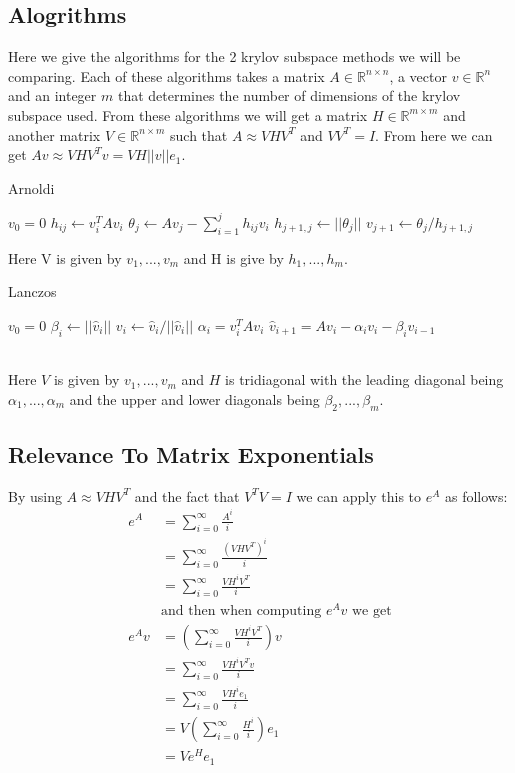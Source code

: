 \documentclass{article}
\begin{document}
\subsection{Alogrithms}
Here we give the algorithms for the 2 krylov subspace methods we will be comparing.
Each of these algorithms takes a matrix $A\in \mathbb{R}^{n\times n}$, a vector $v \in \mathbb{R}^n$ and an integer $m$ that determines the number of dimensions of the krylov subspace used.
From these algorithms we will get a matrix $H \in \mathbb{R}^{m\times m}$ and another matrix $V \in \mathbb{R}^{n\times m}$ such that $A \approx VHV^T$ and $VV^T = I$.
From here we can get $Av \approx VHV^Tv = VH||v||e_1$.

\begin{algorithm}
\caption{Arnoldi \cite{Fan2018}} %
\begin{algorithmic}
\State $v_0 = 0$
\State$h_{ij} \gets v_i^T A v_i$
\EndFor
\State$\theta_j \gets Av_j - \sum^j_{i=1} h_{ij}v_i$
\State$h_{j+1,j} \gets ||\theta_j||$
\State$v_{j+1} \gets \theta_j/h_{j+1,j}$
\EndFor
\EndProcedure
\end{algorithmic}
\end{algorithm}
Here V is given by $v_1,...,v_m$ and H is give by $h_1,...,h_m$.\\
\begin{algorithm}
\caption{Lanczos \cite{OJALVO1970}}
\begin{algorithmic}
\State $v_0 = 0$
\State$\beta_i \gets || \hat v_i ||$
\State$v_i \gets \hat v_i / || \hat v_i ||$
\State$\alpha_i = v_i^T A v_i$
\State$\hat v_{i+1} = Av_i - \alpha_iv_i - \beta_iv_{i-1}$
\EndFor
\EndProcedure
\end{algorithmic}
\end{algorithm}\\
Here $V$ is given by ${v_1,...,v_m}$ and $H$ is tridiagonal with the leading diagonal being $\alpha_1, ..., \alpha_m$ and the upper and lower diagonals being $\beta_2,...,\beta_m$.

\subsection{Relevance To Matrix Exponentials}
By using $A \approx VHV^T$ and the fact that $V^TV = I$ we can apply this to $e^A$ as follows:
\begin{align*}
e^A &= \sum^{\infty}_{i=0}\frac{A^i}{i\!}\\
&= \sum^{\infty}_{i=0}\frac{(VHV^T)^i}{i\!} \\
&= \sum^{\infty}_{i=0}\frac{VH^iV^T}{i\!} \\
&\text {and then when computing $e^Av$ we get}\\
e^Av &= (\sum^{\infty}_{i=0}\frac{VH^iV^T}{i\!})v \\
&= \sum^{\infty}_{i=0}\frac{VH^iV^Tv}{i\!} \\
&= \sum^{\infty}_{i=0}\frac{VH^ie_1}{i\!} \\
&= V(\sum^{\infty}_{i=0}\frac{H^i}{i\!})e_1 \\
&= Ve^He_1
\end{align*}
\end{document}
